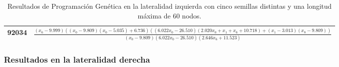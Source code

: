 \begin{table}[H]
{\begin{tabular}{|c|c|}
92034            & $\frac{\left(x_{6} - 9.999\right) \left(\left(x_{0} - 9.809\right) \left(x_{0} - 5.035\right) + 6.736\right) \left(\left(6.022 x_{0} - 26.510\right) \left(2.020 x_{0} + x_{1} + x_{6} + 10.718\right) + \left(x_{1} - 3.013\right) \left(x_{8} - 9.809\right)\right)}{\left(x_{0} - 9.809\right) \left(6.022 x_{0} - 26.510\right) \left(2.646 x_{6} + 11.523\right)}$ \\ \hline
\end{tabular}%
}
\caption{Resultados de Programación Genética en la lateralidad izquierda con cinco semillas distintas y una longitud máxima de 60 nodos.}\label{table:exp_PG_l0_60}
\end{table}



\subsubsection{Resultados en la lateralidad derecha}



\begin{table}[H]
\centering
{}
\caption{Resultados de Programación Genética en la lateralidad derecha con cinco semillas distintas y una longitud máxima de 20 nodos.}\label{table:resultados_PG_l1_20}
\end{table}


